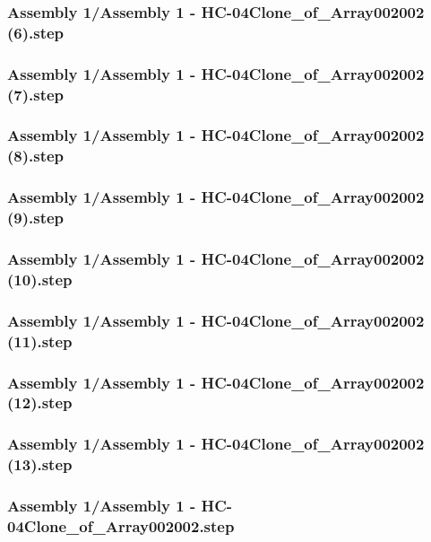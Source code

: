 \documentclass[a4paper,12pt]{article}
\begin{document}
\subsubsection{Assembly 1/Assembly 1 - HC-04Clone_of_Array002002 (6).step}

\subsubsection{Assembly 1/Assembly 1 - HC-04Clone_of_Array002002 (7).step}

\subsubsection{Assembly 1/Assembly 1 - HC-04Clone_of_Array002002 (8).step}

\subsubsection{Assembly 1/Assembly 1 - HC-04Clone_of_Array002002 (9).step}

\subsubsection{Assembly 1/Assembly 1 - HC-04Clone_of_Array002002 (10).step}

\subsubsection{Assembly 1/Assembly 1 - HC-04Clone_of_Array002002 (11).step}

\subsubsection{Assembly 1/Assembly 1 - HC-04Clone_of_Array002002 (12).step}

\subsubsection{Assembly 1/Assembly 1 - HC-04Clone_of_Array002002 (13).step}

\subsubsection{Assembly 1/Assembly 1 - HC-04Clone_of_Array002002.step}

\end{document}
